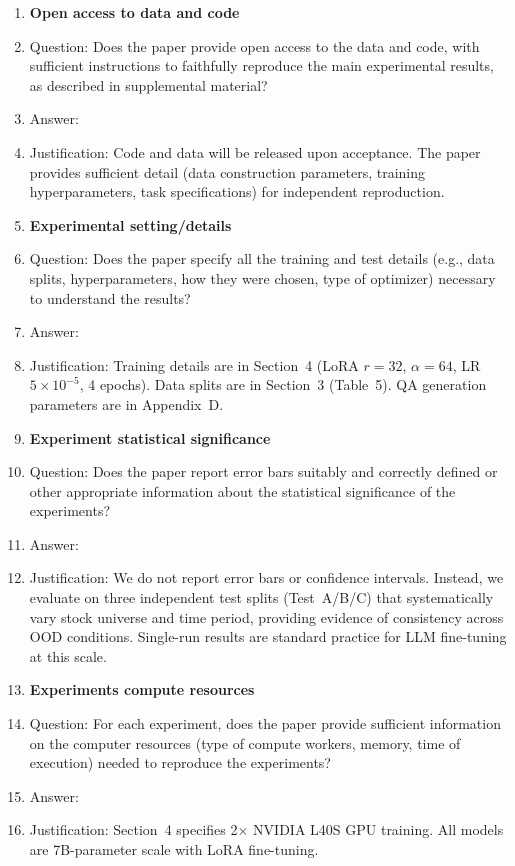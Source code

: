 \begin{enumerate}
\item {\bf Open access to data and code}
    \item[] Question: Does the paper provide open access to the data and code, with sufficient instructions to faithfully reproduce the main experimental results, as described in supplemental material?
    \item[] Answer: \answerYes{}
    \item[] Justification: Code and data will be released upon acceptance. The paper provides sufficient detail (data construction parameters, training hyperparameters, task specifications) for independent reproduction.

\item {\bf Experimental setting/details}
    \item[] Question: Does the paper specify all the training and test details (e.g., data splits, hyperparameters, how they were chosen, type of optimizer) necessary to understand the results?
    \item[] Answer: \answerYes{}
    \item[] Justification: Training details are in Section~4 (LoRA $r{=}32$, $\alpha{=}64$, LR $5{\times}10^{-5}$, 4 epochs). Data splits are in Section~3 (Table~5). QA generation parameters are in Appendix~D.

\item {\bf Experiment statistical significance}
    \item[] Question: Does the paper report error bars suitably and correctly defined or other appropriate information about the statistical significance of the experiments?
    \item[] Answer: \answerNo{}
    \item[] Justification: We do not report error bars or confidence intervals. Instead, we evaluate on three independent test splits (Test~A/B/C) that systematically vary stock universe and time period, providing evidence of consistency across OOD conditions. Single-run results are standard practice for LLM fine-tuning at this scale.

\item {\bf Experiments compute resources}
    \item[] Question: For each experiment, does the paper provide sufficient information on the computer resources (type of compute workers, memory, time of execution) needed to reproduce the experiments?
    \item[] Answer: \answerYes{}
    \item[] Justification: Section~4 specifies 2$\times$ NVIDIA L40S GPU training. All models are 7B-parameter scale with LoRA fine-tuning.


\end{enumerate}
